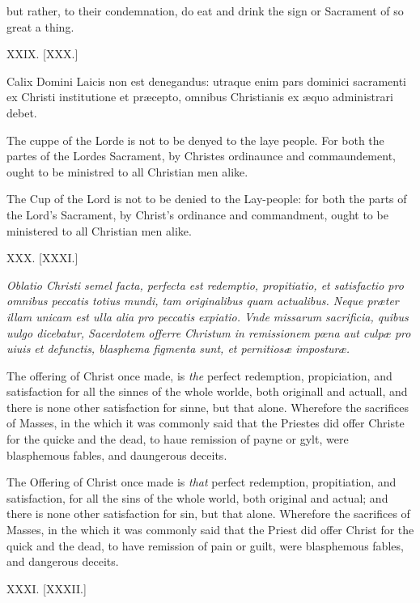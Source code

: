 but rather, to their condemnation, do eat and drink the sign or Sacrament of so great a thing.

XXIX. [XXX.]


Calix Domini Laicis non est denegandus: utraque enim pars dominici sacramenti ex Christi institutione et præcepto, omnibus Christianis ex æquo administrari debet.

The cuppe of the Lorde is not to be denyed to the laye people. For both the partes of the Lordes Sacrament, by Christes ordinaunce and commaundement, ought to be ministred to all Christian men alike.

The Cup of the Lord is not to be denied to the Lay-people: for both the parts of the Lord's Sacrament, by Christ's ordinance and commandment, ought to be ministered to all Christian men alike.

XXX. [XXXI.]


\emph{Oblatio Christi semel facta, perfecta est redemptio, propitiatio, et satisfactio pro omnibus peccatis totius mundi, tam originalibus quam actualibus. Neque præter illam unicam est ulla alia pro peccatis expiatio. Vnde missarum sacrificia, quibus uulgo dicebatur, Sacerdotem offerre Christum in remissionem pœna aut culpæ pro uiuis et defunctis, blasphema figmenta sunt, et pernitiosæ imposturæ.}

The offering of Christ once made, is \emph{the} perfect redemption, propiciation, and satisfaction for all the sinnes of the whole worlde, both originall and actuall, and there is none other satisfaction for sinne, but that alone. Wherefore the sacrifices of Masses, in the which it was commonly said that the Priestes did offer Christe for the quicke and the dead, to haue remission of payne or gylt, were blasphemous fables, and daungerous deceits.

The Offering of Christ once made is \emph{that} perfect redemption, propitiation, and satisfaction, for all the sins of the whole world, both original and actual; and there is none other satisfaction for sin, but that alone. Wherefore the sacrifices of Masses, in the which it was commonly said that the Priest did offer Christ for the quick and the dead, to have remission of pain or guilt, were blasphemous fables, and dangerous deceits.

XXXI. [XXXII.]


